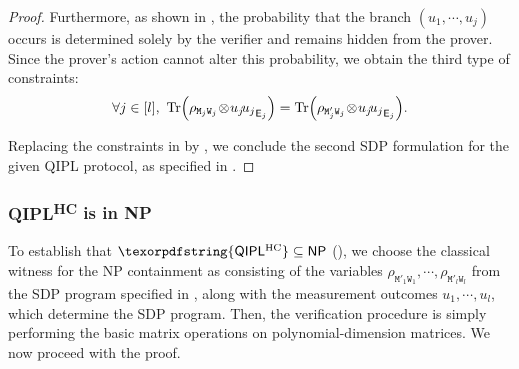 \documentclass[11pt, a4paper]{article}
\numberwithin{equation}{section}
\numberwithin{figure}{section}
\newcommand{\NP}{\textnormal{\textsf{NP}}\xspace}
\newcommand{\QIPL}{\textnormal{\textsf{QIPL}}\xspace}
\newcommand{\QIPLHC}{\texorpdfstring{\textnormal{\textsf{QIPL}\textsuperscript{\textnormal{HC}}}}\xspace}
\DeclarePairedDelimiter\rbra{\lparen}{\rparen}
\let\ket\relax\DeclarePairedDelimiter\ket{\lvert}{\rangle}
\let\bra\relax\DeclarePairedDelimiter\bra{\langle}{\rvert}
\newcommand{\ketbra}[2]{\ensuremath{\ket{#1}\!\bra{#2}}}
\newcommand{\Tr}{\mathrm{Tr}}
\newcommand{\sfE}{\mathsf{E}}
\newcommand{\ttM}{\mathtt{M}}
\newcommand{\ttW}{\mathtt{W}}
\begin{document}
\begin{proof}
    Furthermore, as shown in , the probability that the branch $(u_1,\cdots,u_j)$ occurs is determined solely by the verifier and remains hidden from the prover. Since the prover's action cannot alter this probability, we obtain the third type of constraints:
    \begin{equation}
        \label{eq:QIPL-prover-actions-normalization}
        \forall j \in [l],~\Tr\rbra*{\rho_{\ttM_j\ttW_j} \!\otimes\! \ketbra{u_j}{u_j}_{\sfE_j}} = \Tr\rbra*{\rho_{\ttM'_j\ttW_j} \!\otimes\! \ketbra{u_j}{u_j}_{\sfE_j}}.
    \end{equation}

    Replacing the constraints in  by , we conclude the second SDP formulation for the  given \QIPL{} protocol, as specified in . 
\end{proof}

\subsubsection{\QIPLHC{} is in \NP{}}
\label{subsubsec:QIPL-upper-bounds}

To establish that $\QIPLHC \subseteq \NP$ (), we choose the classical witness for the \NP{} containment as consisting of the variables $\rho_{\ttM'_1\ttW_1}, \cdots, \rho_{\ttM'_l\ttW_l}$ from the SDP program specified in  , along with the measurement outcomes $u_1,\cdots,u_l$, which determine the SDP program. Then, the verification procedure is simply performing the basic matrix operations on polynomial-dimension matrices. We now proceed with the proof. 
\end{document}
